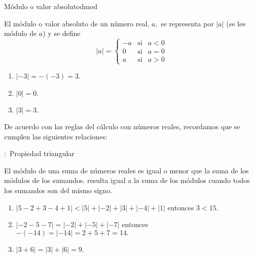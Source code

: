 \begin{defi}{Módulo o valor absoluto}{dmod}

El módulo o valor absoluto de un número real, $a,$ se representa
por $\left|a\right|$ (se lee módulo de $a$) y se define 
\begin{equation}
\left|a\right|=\left\{ \begin{array}{ccc}
-a & \text{si} & a<0\\
0 & \text{si} & a=0\\
a & \text{si} & a>0
\end{array}\right.\label{eq:modulo}
\end{equation}

\end{defi}

\begin{ejemplos}
\begin{enumerate}
\item $\left|-3\right|=-\left(-3\right)=3$.
\item $\left|0\right|=0.$
\item $\left|3\right|=3.$
\end{enumerate}
\end{ejemplos}

De acuerdo con las reglas del cálculo con números reales, recordamos
que se cumplen las siguientes relaciones:

\begin{propiedad}{\hspace{-2pt}:\ Propiedad triangular}

El módulo de una suma de números reales es igual o menor que la suma
de los módulos de los sumandos. resulta igual a la suma de los módulos
cuando todos los sumandos son del mismo signo.

\end{propiedad}

\begin{ejemplos}
\begin{enumerate}
\item $\left|5-2+3-4+1\right|<\left|5\right|+\left|-2\right|+\left|3\right|+\left|-4\right|+\left|1\right|$
entonces $3<15.$
\item $\left|-2-5-7\right|=\left|-2\right|+\left|-5\right|+\left|-7\right|$
entonces $-\left(-14\right)=\left|-14\right|=2+5+7=14.$
\item $\left|3+6\right|=\left|3\right|+\left|6\right|=9.$
\end{enumerate}
\end{ejemplos}

